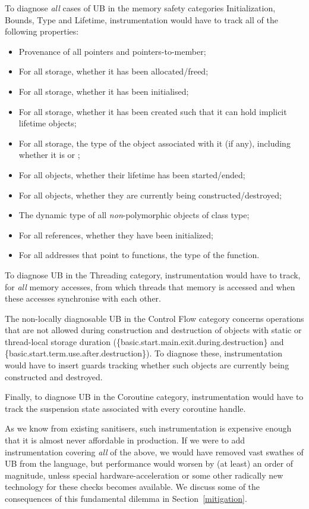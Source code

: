 To diagnose \emph{all} cases of UB in the memory safety categories Initialization, Bounds, Type and Lifetime, instrumentation would have to track all of the following properties:

\begin{itemize}
\item Provenance of all pointers and pointers-to-member;
\item For all storage, whether it has been allocated/freed;
\item For all storage, whether it has been initialised;
\item For all storage, whether it has been created such that it can hold implicit lifetime objects;
\item For all storage, the type of the object associated with it (if any), including whether it is  or ;
\item For all objects, whether their lifetime has been started/ended;
\item For all objects, whether they are currently being constructed/destroyed;
\item The dynamic type of all \emph{non}-polymorphic objects of class type;
\item For all references, whether they have been initialized;
\item For all addresses that point to  functions, the type of the function.
\end{itemize}

To diagnose UB in the Threading category, instrumentation would have to track, for \emph{all} memory accesses, from which threads that memory is accessed and when these accesses synchronise with each other.

The non-locally diagnosable UB in the Control Flow category concerns operations that are not allowed during construction and destruction of objects with static or thread-local storage duration (\{basic.start.main.exit.during.destruction\} and \{basic.start.term.use.after.destruction\}). To diagnose these, instrumentation would have to insert guards tracking whether such objects are currently being constructed and destroyed.  

Finally, to diagnose UB in the Coroutine category, instrumentation would have to track the suspension state associated with every coroutine handle.

As we know from existing sanitisers, such instrumentation is expensive enough that it is almost never affordable in production. If we were to add instrumentation covering \emph{all} of the above, we would have removed vast swathes of UB from the language, but performance would worsen by (at least) an order of magnitude, unless special hardware-acceleration or some other radically new technology for these checks becomes available. We discuss some of the consequences of this fundamental dilemma in Section~\ref{mitigation}.

